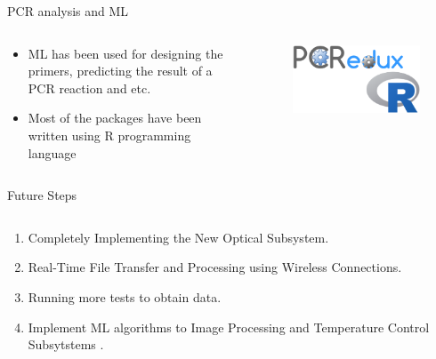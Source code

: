 \documentclass[UKenglish, aspectratio = 169]{beamer}
\begin{document}
\begin{frame}{PCR analysis and ML}
	\begin{columns}
		\begin{column}[T]{0.5\textwidth}
			\vspace*{4ex}
			\begin{itemize}
				\item ML has been used for designing the primers, predicting the result of a PCR reaction and etc.
				\item Most of the packages have been written using R programming language
			\end{itemize}
		\end{column}
		\begin{column}{0.5\textwidth}
			\begin{figure}
				\centering
				\includegraphics[scale=0.45]{OM-images/Rlogo.png}
				\caption{\tiny{}}
			\end{figure}
		\end{column}
	\end{columns}
\end{frame}

\begin{frame}{Future Steps}
	\begin{columns}
		\begin{column}[T]{0.8\textwidth}
			\vspace*{4ex}
			\begin{enumerate}
				\item Completely Implementing the New Optical Subsystem.
				\item Real-Time File Transfer and Processing using Wireless Connections.
				\item Running more tests to obtain data.
				\item Implement ML algorithms to Image Processing and Temperature Control Subsytstems .
			\end{enumerate}
		\end{column}
		\begin{column}{0.2\textwidth}
		\end{column}
	\end{columns}
\end{frame}
\end{document}
